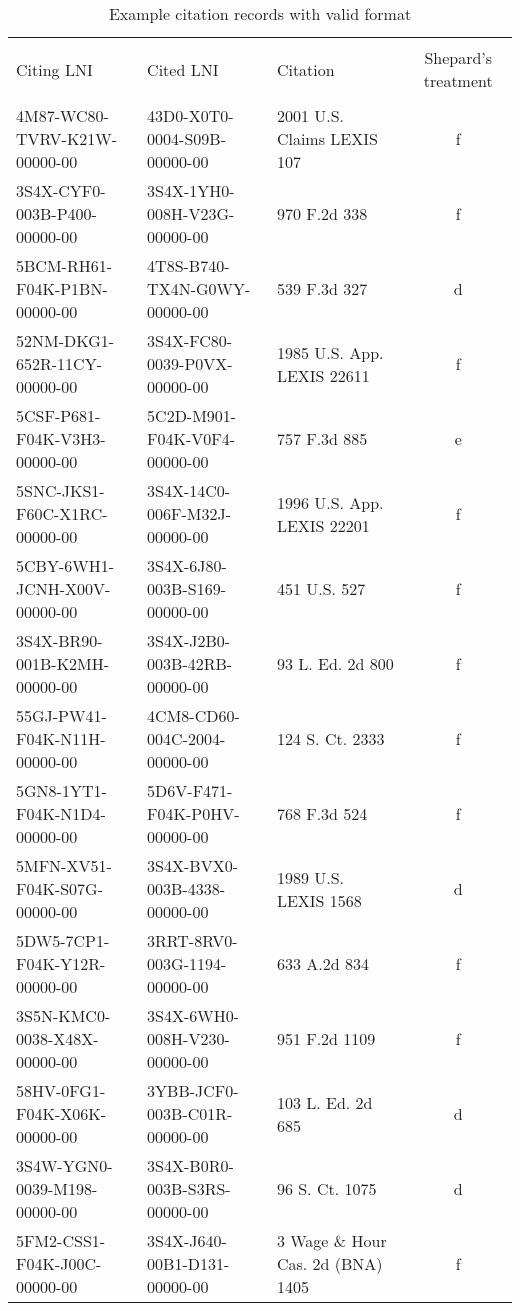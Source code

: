 \documentclass[10pt, letterpaper]{article}
\begin{document}
\begin{spacing}{1.0}
\begin{table}[H]
    \begin{adjustwidth}{-0.225in}{}
    \centering
    \caption{Example citation records with valid format}
    \footnotesize
    \setlength\tabcolsep{2pt}
    \begin{tabular}{lllc}
        \hline\\[-6pt]
        Citing LNI & Cited LNI & Citation & Shepard's treatment\\[2pt]
        \hline\\[-6pt]
        4M87-WC80-TVRV-K21W-00000-00 & 43D0-X0T0-0004-S09B-00000-00 & 2001 U.S. Claims LEXIS 107 & f\\
        3S4X-CYF0-003B-P400-00000-00 & 3S4X-1YH0-008H-V23G-00000-00 & 970 F.2d 338 & f\\
        5BCM-RH61-F04K-P1BN-00000-00 & 4T8S-B740-TX4N-G0WY-00000-00 & 539 F.3d 327 & d\\
        52NM-DKG1-652R-11CY-00000-00 & 3S4X-FC80-0039-P0VX-00000-00 & 1985 U.S. App. LEXIS 22611 & f\\
        5CSF-P681-F04K-V3H3-00000-00 & 5C2D-M901-F04K-V0F4-00000-00 & 757 F.3d 885 & e\\
        5SNC-JKS1-F60C-X1RC-00000-00 & 3S4X-14C0-006F-M32J-00000-00 & 1996 U.S. App. LEXIS 22201 & f\\
        5CBY-6WH1-JCNH-X00V-00000-00 & 3S4X-6J80-003B-S169-00000-00 & 451 U.S. 527 & f\\
        3S4X-BR90-001B-K2MH-00000-00 & 3S4X-J2B0-003B-42RB-00000-00 & 93 L. Ed. 2d 800 & f\\
        55GJ-PW41-F04K-N11H-00000-00 & 4CM8-CD60-004C-2004-00000-00 & 124 S. Ct. 2333 & f\\
        5GN8-1YT1-F04K-N1D4-00000-00 & 5D6V-F471-F04K-P0HV-00000-00 & 768 F.3d 524 & f\\
        5MFN-XV51-F04K-S07G-00000-00 & 3S4X-BVX0-003B-4338-00000-00 & 1989 U.S. LEXIS 1568 & d\\
        5DW5-7CP1-F04K-Y12R-00000-00 & 3RRT-8RV0-003G-1194-00000-00 & 633 A.2d 834 & f\\
        3S5N-KMC0-0038-X48X-00000-00 & 3S4X-6WH0-008H-V230-00000-00 & 951 F.2d 1109 & f\\
        58HV-0FG1-F04K-X06K-00000-00 & 3YBB-JCF0-003B-C01R-00000-00 & 103 L. Ed. 2d 685 & d\\
        3S4W-YGN0-0039-M198-00000-00 & 3S4X-B0R0-003B-S3RS-00000-00 & 96 S. Ct. 1075 & d\\
        5FM2-CSS1-F04K-J00C-00000-00 & 3S4X-J640-00B1-D131-00000-00 & 3 Wage \& Hour Cas. 2d (BNA) 1405 & f\\

\end{tabular}
\end{adjustwidth}
\end{table}
\end{spacing}
\end{document}
